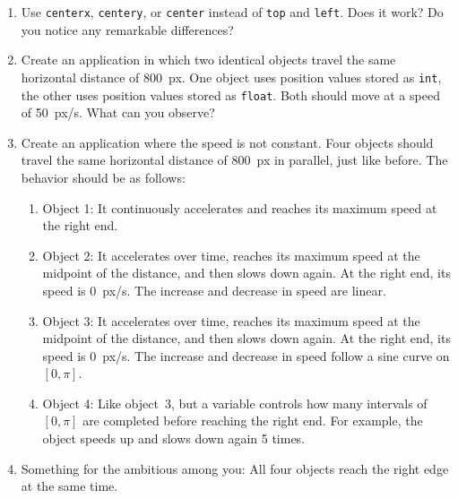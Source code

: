 \begin{enumerate}
	\item Use \texttt{centerx}, \texttt{centery}, or \texttt{center} instead of \texttt{top} and \texttt{left}. Does it work? Do you notice any remarkable differences?
	
	\item Create an application in which two identical objects travel the same horizontal distance of \SI{800}{px}. One object uses position values stored as \texttt{int}, the other uses position values stored as \texttt{float}. Both should move at a speed of \SI{50}{px/s}. What can you observe?
	
	\item Create an application where the speed is not constant. Four objects should travel the same horizontal distance of \SI{800}{px} in parallel, just like before. The behavior should be as follows:
	
	\begin{enumerate}
		\item Object 1: It continuously accelerates and reaches its maximum speed at the right end.
		
		\item Object 2: It accelerates over time, reaches its maximum speed at the midpoint of the distance, and then slows down again. At the right end, its speed is \SI{0}{px/s}. The increase and decrease in speed are linear.
		
		\item Object 3: It accelerates over time, reaches its maximum speed at the midpoint of the distance, and then slows down again. At the right end, its speed is \SI{0}{px/s}. The increase and decrease in speed follow a sine curve on $[0, \pi]$.
		
		\item Object 4: Like object~3, but a variable controls how many intervals of $[0, \pi]$ are completed before reaching the right end. For example, the object speeds up and slows down again 5 times.
	\end{enumerate}
	
	\item Something for the ambitious among you: All four objects reach the right edge at the same time.
\end{enumerate}
